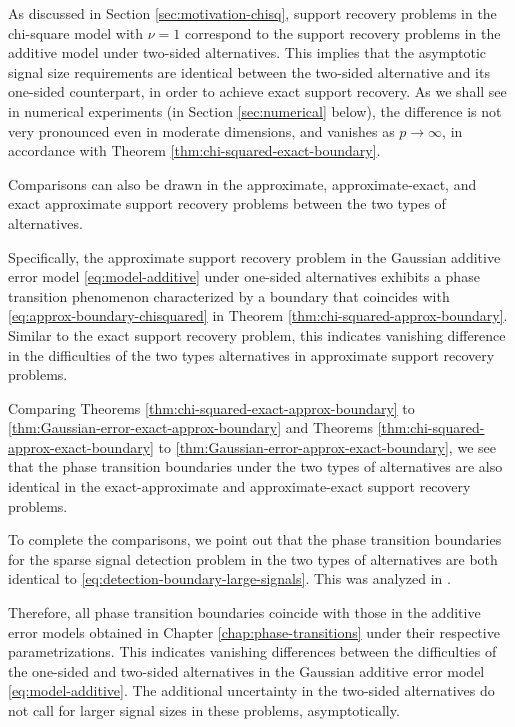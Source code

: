 As discussed in Section \ref{sec:motivation-chisq}, support recovery problems in the chi-square model with $\nu=1$ correspond to the support recovery problems in 
the additive model under two-sided alternatives. This implies that the asymptotic signal size requirements are identical between the two-sided alternative and its 
one-sided counterpart, in order to achieve exact support recovery. As we shall see in numerical experiments (in Section \ref{sec:numerical} below), the difference 
is not very pronounced even in moderate dimensions, and vanishes as $p\to\infty$, in accordance with Theorem \ref{thm:chi-squared-exact-boundary}.

\medskip

Comparisons can also be drawn in the approximate, approximate-exact, and exact approximate support recovery problems between the two types of alternatives.

Specifically, the approximate support recovery problem in the Gaussian additive error model \eqref{eq:model-additive} under one-sided alternatives exhibits a phase transition phenomenon characterized by a boundary that coincides with \eqref{eq:approx-boundary-chisquared} in Theorem \ref{thm:chi-squared-approx-boundary}.
Similar to the exact support recovery problem, this indicates vanishing difference in the difficulties of the two types alternatives in approximate support recovery problems.

Comparing Theorems \ref{thm:chi-squared-exact-approx-boundary} to \ref{thm:Gaussian-error-exact-approx-boundary} and Theorems \ref{thm:chi-squared-approx-exact-boundary} to \ref{thm:Gaussian-error-approx-exact-boundary}, we see that the phase transition boundaries under the two types of alternatives are also identical in the exact-approximate and approximate-exact support recovery problems.

To complete the comparisons, we point out that the phase transition boundaries for the sparse signal {detection} problem in the two types of alternatives are both identical to \eqref{eq:detection-boundary-large-signals}. This was analyzed in \cite{donoho2004higher}.

Therefore, all phase transition boundaries coincide with those in the additive error models obtained in Chapter \ref{chap:phase-transitions} under their respective parametrizations.
This indicates vanishing differences between the difficulties of the one-sided and two-sided alternatives in the Gaussian additive error model \eqref{eq:model-additive}.
The additional uncertainty in the two-sided alternatives do not call for larger signal sizes in these problems, asymptotically.


